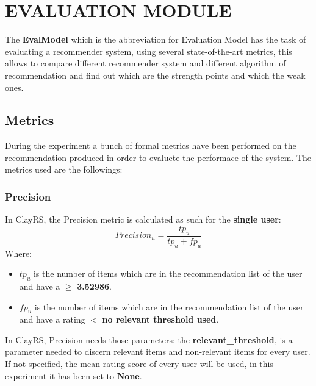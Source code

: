 \documentclass[11pt]{article}
\begin{document}



\section{EVALUATION MODULE}\label{sec:eva-module}
The \textbf{EvalModel} which is the abbreviation for Evaluation Model has the task of evaluating a recommender system,
using several state-of-the-art metrics, this allows to compare different recommender system and different algorithm of
recommendation and find out which are the strength points and which the weak ones.

\subsection{Metrics}\label{subsec:metrics}
During the experiment a bunch of formal metrics have been performed on the recommendation produced in order to evaluete
the performace of the system.
The metrics used are the followings:
\hfill\break
\hfill\break



\subsubsection{Precision}\label{sec:precision}
In ClayRS, the Precision metric is calculated as such for the \textbf{single user}:
\hfill\break
\hfill\break
    \[
         Precision_u = \frac{tp_u}{tp_u + fp_u}
    \]
\hfill\break
\hfill\break
    Where:
\begin{itemize}
    \item $tp_u$ is the number of items which are in the recommendation list of the user and have a
       $\geq$         \textbf{3.52986}.
            \item $fp_u$ is the number of items which are in the recommendation list of the user and have a
      rating $<$         \textbf{no relevant threshold used}.
        \end{itemize}
\hfill\break
\hfill\break
In ClayRS, Precision needs those parameters:
the \textbf{relevant\_threshold}, is a parameter needed to discern relevant items and non-relevant items for every user.
If not specified, the mean rating score of every user will be used, in this experiment it has been set to
\textbf{None}.
\hfill\break
\hfill\break
\end{document}
